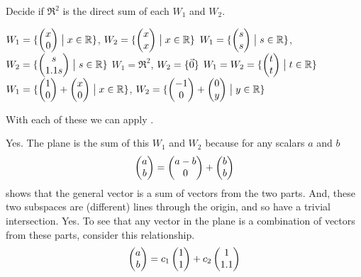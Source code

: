 \begin{exercises}
  \recommended \item
    Decide if \( \Re^2 \) is the direct sum of each \( W_1 \) and \( W_2 \).
    \begin{exparts}
       \partsitem \( W_1=\mbox{$\{\begin{pmatrix} x \\ 0 \end{pmatrix}\bigm| x\in\mathbb{R}\}$} \),
             \( W_2=\mbox{$\{\begin{pmatrix} x \\ x \end{pmatrix}\bigm| x\in\mathbb{R}\}$} \)
       \partsitem \( W_1=\mbox{$\{\begin{pmatrix} s \\ s \end{pmatrix}\bigm| s\in\mathbb{R}\}$} \),
             \( W_2=\mbox{$\{\begin{pmatrix} s \\ 1.1s \end{pmatrix}\bigm| s\in\mathbb{R}\}$} \)
       \partsitem \( W_1=\Re^2 \), \( W_2=\mbox{$\{\vec{0}\}$} \)
       \partsitem \( W_1=W_2=\mbox{$\{\begin{pmatrix} t \\ t \end{pmatrix}\bigm| t\in\mathbb{R}\}$} \)
       \partsitem \( W_1=\mbox{$\{\begin{pmatrix} 1 \\ 0 \end{pmatrix}+\begin{pmatrix} x \\ 0 \end{pmatrix}
                                \bigm| x\in\mathbb{R}\}$} \),
             \( W_2=\mbox{$\{\begin{pmatrix} -1 \\ 0 \end{pmatrix}+\begin{pmatrix} 0 \\ y \end{pmatrix}\bigm| y\in\mathbb{R}\}$} \)
    \end{exparts}
    \begin{answer}
       With each of these we can apply .
       \begin{exparts}
         \partsitem Yes.
           The plane is the sum of this $W_1$ and $W_2$ because for any 
           scalars $a$ and $b$
           \begin{equation*}
             \begin{pmatrix} a \\ b \end{pmatrix}
             =\begin{pmatrix} a-b \\ 0 \end{pmatrix}
             +\begin{pmatrix} b \\ b \end{pmatrix}
           \end{equation*}
           shows that the general vector is a sum of vectors from the two
           parts.
           And, these two subspaces are (different) lines through the origin,
           and so have a trivial intersection.
         \partsitem Yes.
           To see that any vector in the plane is a combination of vectors
           from these parts, consider this relationship.
           \begin{equation*}
             \begin{pmatrix} a \\ b \end{pmatrix}=c_1\begin{pmatrix} 1 \\ 1 \end{pmatrix}+c_2\begin{pmatrix} 1 \\ 1.1 \end{pmatrix}
           \end{equation*}

\end{exparts}
\end{answer}
\end{exercises}
